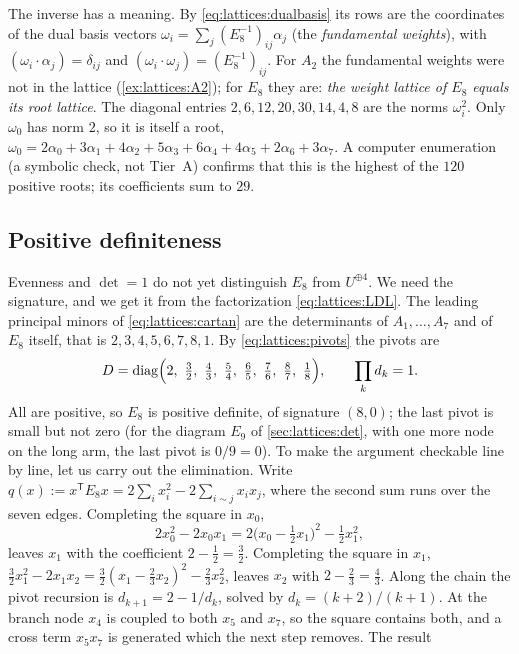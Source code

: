 The inverse has a meaning. By \eqref{eq:lattices:dualbasis} its rows are the coordinates of
the dual basis vectors $\omega_i=\sum_j(E_8^{-1})_{ij}\alpha_j$ (the \emph{fundamental
weights}), with $(\omega_i\cdot\alpha_j)=\delta_{ij}$ and
$(\omega_i\cdot\omega_j)=(E_8^{-1})_{ij}$. For $A_2$ the fundamental weights were not in the
lattice (\cref{ex:lattices:A2}); for $E_8$ they are: \emph{the weight lattice of $E_8$
equals its root lattice}. The diagonal entries $2,6,12,20,30,14,4,8$ are the norms
$\omega_i^2$. Only $\omega_0$ has norm $2$, so it is itself a root,
$\omega_0=2\alpha_0+3\alpha_1+4\alpha_2+5\alpha_3+6\alpha_4+4\alpha_5+2\alpha_6+3\alpha_7$.
A computer enumeration (a symbolic check, not Tier~A) confirms that this is the highest of
the $120$ positive roots; its coefficients sum to $29$.

\subsection{Positive definiteness}\label{sec:lattices:posdef}
Evenness and $\det=1$ do not yet distinguish $E_8$ from $U^{\oplus4}$. We need the signature,
and we get it from the factorization \eqref{eq:lattices:LDL}. The leading principal minors of
\eqref{eq:lattices:cartan} are the determinants of $A_1,\dots,A_7$ and of $E_8$ itself, that
is $2,3,4,5,6,7,8,1$. By \eqref{eq:lattices:pivots} the pivots are
\begin{equation}\label{eq:lattices:pivotsE8}
 D=\diag\Bigl(2,\ \tfrac32,\ \tfrac43,\ \tfrac54,\ \tfrac65,\ \tfrac76,\ \tfrac87,\
 \tfrac18\Bigr),\qquad \prod_kd_k=1 .
\end{equation}
All are positive, so $E_8$ is positive definite, of signature $(8,0)$; the last pivot is
small but not zero (for the diagram $E_9$ of \cref{sec:lattices:det}, with one more node on
the long arm, the last pivot is $0/9=0$). To make
the argument checkable line by line, let us carry out the elimination. Write
$q(x):=x^{\mathsf T}E_8x=2\sum_ix_i^2-2\sum_{i\sim j}x_ix_j$, where the second sum runs over
the seven edges. Completing the square in $x_0$,
\[
 2x_0^2-2x_0x_1=2\bigl(x_0-\tfrac12x_1\bigr)^2-\tfrac12x_1^2 ,
\]
leaves $x_1$ with the coefficient $2-\frac12=\frac32$. Completing the square in $x_1$,
$\frac32x_1^2-2x_1x_2=\frac32(x_1-\frac23x_2)^2-\frac23x_2^2$, leaves $x_2$ with
$2-\frac23=\frac43$. Along the chain the pivot recursion is $d_{k+1}=2-1/d_k$, solved by
$d_k=(k+2)/(k+1)$. At the branch node $x_4$ is coupled to both $x_5$ and $x_7$, so the square
contains both, and a cross term $x_5x_7$ is generated which the next step removes. The result
